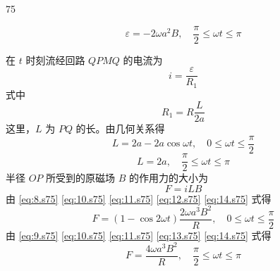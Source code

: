 \begin{solution}{75}
\begin{subsolution}
        \begin{equation}
            \varepsilon = - 2 \omega a^{2} B,\quad \frac{\pi}{2} \leq \omega t \leq \pi
            \label{eq:9.s75}
        \end{equation}
    \end{subsolution}
    \begin{subsolution}
        在 $t$ 时刻流经回路 $QPMQ$ 的电流为
        \begin{equation}
            i = \frac{\varepsilon}{R_{1}}
            \label{eq:10.s75}
        \end{equation}
        式中
        \begin{equation}
            R_{1} = R \frac{L}{2 a}
            \label{eq:11.s75}
        \end{equation}
        这里，$L$ 为 $PQ$ 的长。由几何关系得
        \begin{equation}
            L = 2 a - 2 a \cos \omega t,\quad 0 \leq \omega t \leq \frac{\pi}{2}
            \label{eq:12.s75}
        \end{equation}
        \begin{equation}
            L = 2 a,\quad \frac{\pi}{2} \leq \omega t \leq \pi
            \label{eq:13.s75}
        \end{equation}
        半径 $OP$ 所受到的原磁场 $B$ 的作用力的大小为
        \begin{equation}
            F = i L B
            \label{eq:14.s75}
        \end{equation}
        由 \eqref{eq:8.s75} \eqref{eq:10.s75} \eqref{eq:11.s75} \eqref{eq:12.s75} \eqref{eq:14.s75} 式得
        \begin{equation}
            F = (1 - \cos 2 \omega t) \frac{2 \omega a^{3} B^{2}}{R},\quad 0 \leq \omega t \leq \frac{\pi}{2}
            \label{eq:15.s75}
        \end{equation}
        由 \eqref{eq:9.s75} \eqref{eq:10.s75} \eqref{eq:11.s75} \eqref{eq:13.s75} \eqref{eq:14.s75} 式得
        \begin{equation}
            F = \frac{4 \omega a^{3} B^{2}}{R},\quad \frac{\pi}{2} \leq \omega t \leq \pi
            \label{eq:16.s75}
        \end{equation}
    \end{subsolution}
\end{solution}